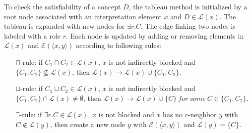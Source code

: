 \documentclass{article}
\begin{document}
To check the satisfiability of a concept $D$, the tableau method is initialized by a root node associated with an interpretation element $x$ and $D\in \mathcal{L}(x)$. 
The tableau is expanded with new nodes for $\exists r.C$. The edge linking two nodes is  labeled with a role $r$. Each node is updated by 
adding or removing elements in $\mathcal{L}(x)$ and  $\mathcal{E}(\langle x,y\rangle)$ according to following rules:
\begin{itemize}
\item[$\sqcap$-rule:] if $C_1\sqcap C_2\in \mathcal{L}(x)$, $x$ is not indirectly blocked and $\{C_1,C_2\}\nsubseteq \mathcal{L}(x)$, then $ \mathcal{L}(x)\rightarrow  \mathcal{L}(x)\cup \{C_1,C_2\}$.
\begin{center}
\end{center}
\item[$\sqcup$-rule:] if $C_1\sqcup C_2\in \mathcal{L}(x)$, $x$ is not indirectly blocked and $\{C_1,C_2\} \cap \mathcal{L}(x)\neq \emptyset$, then $ \mathcal{L}(x)\rightarrow 
\mathcal{L}(x)\cup \{C\}~for ~some ~C\in\{C_1,C_2\}$.
\begin{center}
\end{center}
\item[$\exists$-rule:]  if $\exists r.C\in \mathcal{L}(x)$, $x$ is not blocked and $x$ has no $r$-neighbor $y$ with $C\notin \mathcal{L}(y)$, then create a new node $y$ 
with $\mathcal{E}(\langle x,y\rangle)$ and $\mathcal{L}(y)=\{C\}$.
\begin{center}
\end{center}
\end{itemize}
\end{document}
